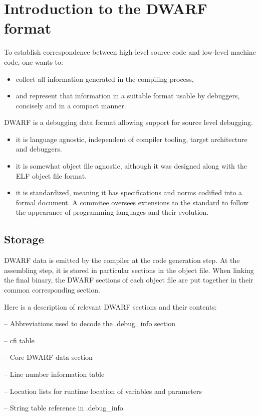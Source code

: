 \chapter{Introduction to the DWARF format\label{cha:chapter2}}

To establish correspondence between high-level source code and low-level machine
code, one wants to:
\begin{itemize}
    \item collect all information generated in the compiling process,
    \item and represent that information in a suitable format usable by
        debuggers, concisely and in a compact manner.
\end{itemize}

DWARF is a debugging data format allowing support for source level debugging.

\begin{itemize}
    \item it is language agnostic, independent of compiler tooling, target architecture and debuggers.
    \item it is somewhat object file agnostic, although it was designed along
        with the ELF object file format.
    \item it is standardized, meaning it has specifications and norms codified into
        a formal document. A commitee oversees extensions to the standard to
        follow the appearance of programming languages and their evolution.
\end{itemize}

\section{Storage}

DWARF data is emitted by the compiler at the code generation step.
At the assembling step, it is stored in particular sections in the object file.
When linking the final binary, the DWARF sections of each object file are
put together in their common corresponding section.

Here is a description of relevant DWARF sections and their contents:

\begin{description}[labelwidth=\widthof{\bfseries .debug\_abbrev},align=parright]
    \item[.debug\_abbrev] -- Abbreviations used to decode the .debug\_info section
    \item[.debug\_frame] -- \Gls{cfi} table
    \item[.debug\_info] -- Core DWARF data section
    \item[.debug\_line] -- Line number information table
    \item[.debug\_loc] -- Location lists for runtime location of variables and parameters
    \item[.debug\_str] -- String table reference in .debug\_info
\end{description}

